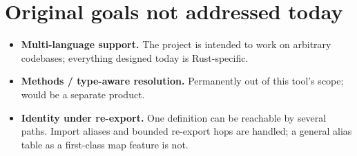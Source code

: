 \documentclass[11pt,a4paper]{article}
\begin{document}
\section{Original goals not addressed today}

\begin{itemize}[nosep]
  \item \textbf{Multi-language support.} The project is intended to work on
    arbitrary codebases; everything designed today is Rust-specific.
  \item \textbf{Methods / type-aware resolution.} Permanently out of this
    tool's scope; would be a separate product.
  \item \textbf{Identity under re-export.} One definition can be reachable by
    several paths. Import aliases and bounded re-export hops are handled;
    a general alias table as a first-class map feature is not.
\end{itemize}
\end{document}
